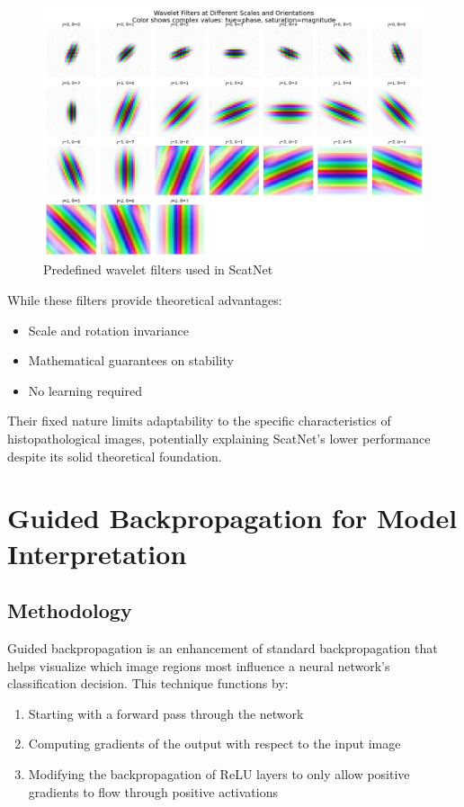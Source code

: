 \documentclass[10pt,twocolumn]{article}
\begin{document}
\begin{figure}[h]
\centering
\includegraphics[width=0.7\columnwidth]{imgs/scatnet_filters.png}
\caption{Predefined wavelet filters used in ScatNet}
\label{fig:scatnet_filters}
\end{figure}

While these filters provide theoretical advantages:
\begin{itemize}
    \item Scale and rotation invariance
    \item Mathematical guarantees on stability
    \item No learning required
\end{itemize}

Their fixed nature limits adaptability to the specific characteristics of histopathological images, potentially explaining ScatNet's lower performance despite its solid theoretical foundation.

\section{Guided Backpropagation for Model Interpretation}
\subsection{Methodology}
Guided backpropagation is an enhancement of standard backpropagation that helps visualize which image regions most influence a neural network's classification decision. This technique functions by:

\begin{enumerate}
    \item Starting with a forward pass through the network
    \item Computing gradients of the output with respect to the input image
    \item Modifying the backpropagation of ReLU layers to only allow positive gradients to flow through positive activations
\end{enumerate}
\end{document}
